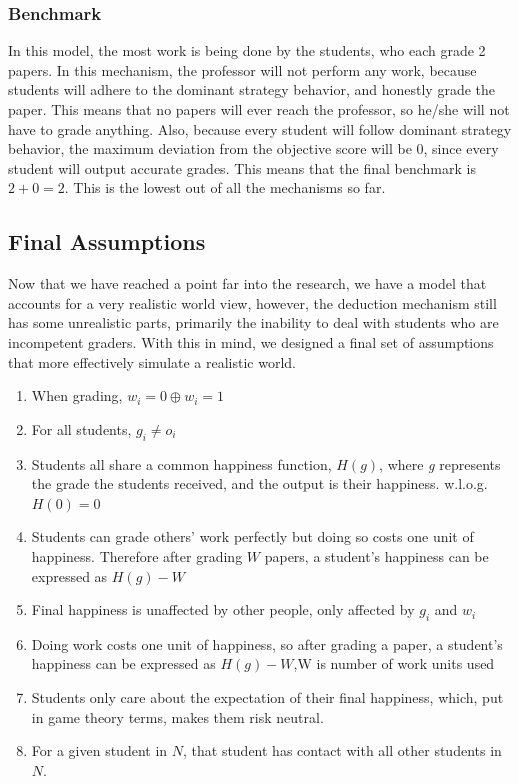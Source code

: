 \documentclass[12pt, Arial]{article}
\begin{document}
\subsubsection{Benchmark}
In this model, the most work is being done by the students, who each grade 2 papers. In this mechanism, the professor will not perform any work, because students will adhere to the dominant strategy behavior, and honestly grade the paper. This means that no papers will ever reach the professor, so he/she will not have to grade anything. Also, because every student will follow dominant strategy behavior, the maximum deviation from the objective score will be 0, since every student will output accurate grades. This means that the final benchmark is $2+0=2$. This is the lowest out of all the mechanisms so far.
\subsection{Final Assumptions}
Now that we have reached a point far into the research, we have a model that accounts for a very realistic world view, however, the deduction mechanism still has some unrealistic parts, primarily the inability to deal with students who are incompetent graders. With this in mind, we designed a final set of assumptions that more effectively simulate a realistic world.

\begin{enumerate}[itemsep=0pt, parsep=0pt]
\item When grading, $w_i=0 \oplus w_i=1$
\item For all students, $g_i \neq o_i$
\item Students all share a common happiness function, $H(g)$, where \emph{g} represents the grade the students received, and the output is their happiness. w.l.o.g. $H(0)=0$
\item Students can grade others' work perfectly but doing so costs one unit of happiness. Therefore after grading $W$ papers, a student's happiness can be expressed as $H(g)-W$
\item Final happiness is unaffected by other people, only affected by $g_i$ and $w_i$
\item Doing work costs one unit of happiness, so after grading a paper, a student's happiness can be expressed as $H(g)-W$,W is number of work units used
\item Students only care about the expectation of their final happiness, which, put in game theory terms, makes them risk neutral.
\item For a given student in $N$, that student has contact with all other students in $N$.
\end{enumerate}
\newpage
\end{document}
